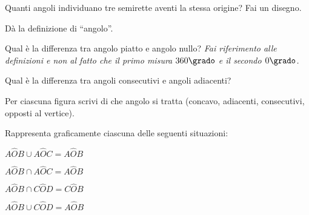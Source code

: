 \begin{esercizio}
\label{ese:1.53}
Quanti angoli individuano tre semirette aventi la stessa origine? Fai 
un disegno.
\end{esercizio}

\begin{esercizio}
\label{ese:1.54}
Dà la definizione di ``angolo''.
\end{esercizio}

\begin{esercizio}
\label{ese:1.55}
Qual è la differenza tra angolo piatto e angolo nullo? \emph{Fai 
riferimento alle definizioni e non al fatto che il primo misura 
$360\grado$ e il secondo $0\grado$.}
\end{esercizio}

\begin{esercizio}
\label{ese:1.56}
Qual è la differenza tra angoli consecutivi e angoli adiacenti?
\end{esercizio}

\begin{esercizio}
\label{ese:1.57}
Per ciascuna figura scrivi di che angolo si tratta 
(concavo, adiacenti, consecutivi, opposti al vertice).
\end{esercizio}

\begin{inaccessibleblock}
 \centering
\end{inaccessibleblock}

\begin{esercizio}
\label{ese:1.58}
Rappresenta graficamente ciascuna delle seguenti situazioni:
\begin{multicols}{2}
\begin{enumeratea}
\item $A\widehat{O}B\cup A\widehat{O}C=A\widehat{O}B$
\item $A\widehat{O}B\cap A\widehat{O}C=A\widehat{O}B$
\item $A\widehat{O}B\cap C\widehat{O}D=C\widehat{O}B$
\item $A\widehat{O}B\cup C\widehat{O}D=A\widehat{O}B$
\end{enumeratea}
\end{multicols}
\end{esercizio}

